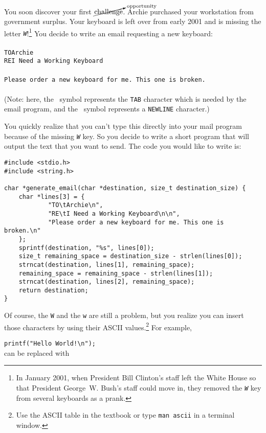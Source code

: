 You soon discover your first $\cancelto{\mathrm{opportunity}}{\mathrm{challenge}}$.
Archie purchased your workstation from government surplus.
Your keyboard is left over from early 2001 and is missing the letter \textit{\texttt{W}}!\footnote{In January 2001, when President Bill Clinton's staff left the White House so that President George~W. Bush's staff could move in, they removed the \textit{\texttt{W}} key from several keyboards as a prank.}
You decide to write an email requesting a new keyboard: \\
\\
\texttt{TO\tab Archie\nl} \\
\texttt{RE\tab I Need a Working Keyboard\nl} \\
\nl \\
\texttt{Please order a new keyboard for me. This one is broken.\nl } \\ \\
(Note: here, the \tab\ symbol represents the \texttt{TAB} character which is needed by the email program, and the \nl\ symbol represents a \texttt{NEWLINE} character.)

You quickly realize that you can't type this directly into your mail program because of the missing \textit{\texttt{W}} key.
So you decide to write a short program that will output the text that you want to send.
The code you would like to write is:

\begin{lstlisting}
#include <stdio.h>
#include <string.h>

char *generate_email(char *destination, size_t destination_size) {
    char *lines[3] = {
            "TO\tArchie\n",
            "RE\tI Need a Working Keyboard\n\n",
            "Please order a new keyboard for me. This one is broken.\n"
    };
    sprintf(destination, "%s", lines[0]);
    size_t remaining_space = destination_size - strlen(lines[0]);
    strncat(destination, lines[1], remaining_space);
    remaining_space = remaining_space - strlen(lines[1]);
    strncat(destination, lines[2], remaining_space);
    return destination;
}
\end{lstlisting}

Of course, the \texttt{W} and the \texttt{w} are still a problem, but you realize you can insert those characters by using their ASCII values.\footnote{Use the ASCII table in the textbook or type \texttt{man ascii} in a terminal window.}
For example,

\lstinline{printf("Hello World!\n");} \\
can be replaced with

